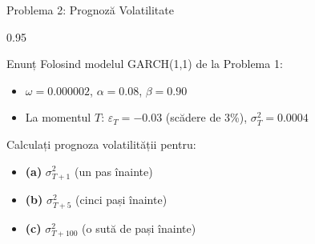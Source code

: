 \documentclass[9pt, aspectratio=169, t]{beamer}
\begin{document}
\begin{frame}{Problema 2: Prognoză Volatilitate}
    \begin{cminipage}{0.95\textwidth}
    \begin{block}{Enunț}
        Folosind modelul GARCH(1,1) de la Problema 1:
        \begin{itemize}\setlength{\itemsep}{0pt}
            \item $\omega = 0.000002$, $\alpha = 0.08$, $\beta = 0.90$
            \item La momentul $T$: $\varepsilon_T = -0.03$ (scădere de 3\%), $\sigma_T^2 = 0.0004$
        \end{itemize}

        \vspace{0.3cm}
        Calculați prognoza volatilității pentru:
        \begin{itemize}\setlength{\itemsep}{0pt}
            \item \textbf{(a)} $\sigma_{T+1}^2$ (un pas înainte)
            \item \textbf{(b)} $\sigma_{T+5}^2$ (cinci pași înainte)
            \item \textbf{(c)} $\sigma_{T+100}^2$ (o sută de pași înainte)
        \end{itemize}
    \end{block}
    \end{cminipage}
\end{frame}
\end{document}
